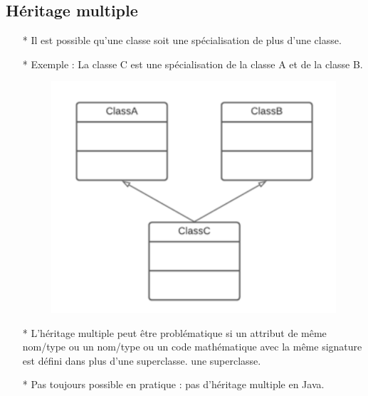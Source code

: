 \documentclass[12pt]{article}
\begin{document}
	\subsection{Héritage multiple}
	\begin{itemize}
		\item[* ] Il est possible qu'une classe soit une spécialisation de plus d'une classe.
		\item[* ] Exemple : La classe C est une spécialisation de la classe A et de la classe B.
			\begin{figure}[!hbtp]
			\centering
			\includegraphics[scale=0.75]{Capture3.PNG}
		\end{figure}
	\item[* ] L'héritage multiple peut être problématique si un attribut de même nom/type ou un
	nom/type ou un code mathématique avec la même signature est défini dans plus d'une superclasse.
	une superclasse.
	\item[* ] Pas toujours possible en pratique : pas d'héritage multiple en Java.
	
	\end{itemize}
\end{document}
